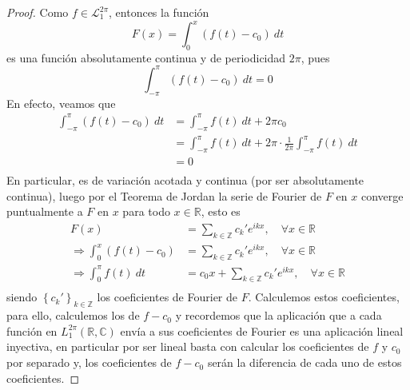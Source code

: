 \documentclass[12pt]{report}
\theoremstyle{largebreak}
\begin{document}
    \begin{proof}
        Como $f\in\mathcal{L}_1^{2\pi}$, entonces la función
        \begin{equation*}
            F(x)=\int_{0}^{x}\left(f(t)-c_0 \right)\:dt
        \end{equation*}
        es una función absolutamente continua y de periodicidad $2\pi$, pues
        \begin{equation*}
            \int_{-\pi}^{\pi}(f(t)-c_0)\:dt=0
        \end{equation*}
        En efecto, veamos que
        \begin{equation*}
            \begin{split}
                \int_{-\pi}^{\pi}(f(t)-c_0)\:dt&=\int_{-\pi}^{\pi}f(t)\:dt+2\pi c_0\\
                &=\int_{-\pi}^{\pi}f(t)\:dt+2\pi\cdot\frac{1}{2\pi}\int_{-\pi}^{\pi}f(t)\:dt\\
                &=0\\
            \end{split}
        \end{equation*}
        En particular, es de variación acotada y continua (por ser absolutamente continua), luego por el Teorema de Jordan la serie de Fourier de $F$ en $x$ converge puntualmente a $F$ en $x$ para todo $x\in\mathbb{R}$, esto es
        \begin{equation*}
            \begin{split}
                F(x)&=\sum_{ k\in\mathbb{Z}}c_k'e^{ ikx},\quad\forall x\in\mathbb{R}\\
                \Rightarrow \int_{0}^{x}(f(t)-c_0)&=\sum_{ k\in\mathbb{Z}}c_k'e^{ ikx},\quad\forall x\in\mathbb{R}\\
                \Rightarrow \int_{0}^{\pi}f(t)\:dt&=c_0x+\sum_{ k\in\mathbb{Z}}c_k'e^{ ikx},\quad\forall x\in\mathbb{R}\\
            \end{split}
        \end{equation*}
        siendo $\left\{c_k'\right\}_{ k\in\mathbb{Z}}$ los coeficientes de Fourier de $F$. Calculemos estos coeficientes, para ello, calculemos los de $f-c_0$ y recordemos que la aplicación que a cada función en $L_1^{2\pi}(\mathbb{R},\mathbb{C})$ envía a sus coeficientes de Fourier es una aplicación lineal inyectiva, en particular por ser lineal basta con calcular los coeficientes de $f$ y $c_0$ por separado y, los coeficientes de $f-c_0$ serán la diferencia de cada uno de estos coeficientes.


\end{proof}
\end{document}
